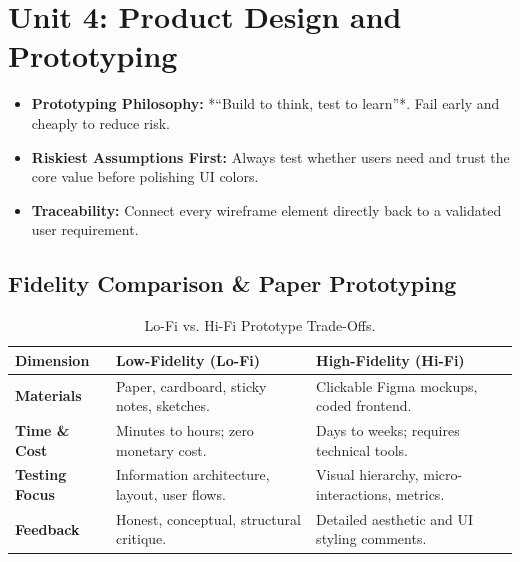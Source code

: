 \chapter{Unit 4: Product Design and Prototyping}
\label{chap:unit4_rev}

\begin{revbox}
\begin{itemize}[leftmargin=1.2em, itemsep=2pt]
    \item \textbf{Prototyping Philosophy:} *``Build to think, test to learn''*. Fail early and cheaply to reduce risk.
    \item \textbf{Riskiest Assumptions First:} Always test whether users need and trust the core value before polishing UI colors.
    \item \textbf{Traceability:} Connect every wireframe element directly back to a validated user requirement.
\end{itemize}
\end{revbox}

\section{Fidelity Comparison \& Paper Prototyping}

\begin{table}[h!]
\centering
\small
\renewcommand{\arraystretch}{1.3}
\begin{tabularx}{\linewidth}{p{2.8cm}X X}
\toprule
\textbf{Dimension} & \textbf{Low-Fidelity (Lo-Fi)} & \textbf{High-Fidelity (Hi-Fi)} \\
\midrule
\textbf{Materials} & Paper, cardboard, sticky notes, sketches. & Clickable Figma mockups, coded frontend. \\
\textbf{Time \& Cost} & Minutes to hours; zero monetary cost. & Days to weeks; requires technical tools. \\
\textbf{Testing Focus} & Information architecture, layout, user flows. & Visual hierarchy, micro-interactions, metrics. \\
\textbf{Feedback} & Honest, conceptual, structural critique. & Detailed aesthetic and UI styling comments. \\
\bottomrule
\end{tabularx}
\caption{Lo-Fi vs. Hi-Fi Prototype Trade-Offs.}
\end{table}

